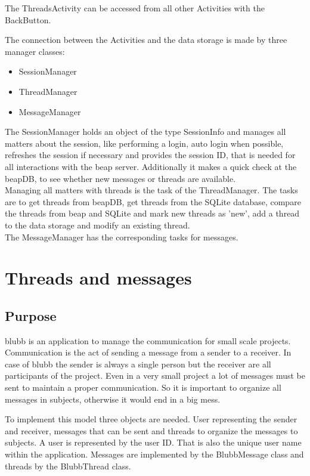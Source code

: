 \documentclass[12pt,a4paper,oneside]{report}
\newcommand{\appname}{blubb}
\newcommand{\beapDB}{beapDB}
\newcommand{\beapServer}{beap server}
\begin{document}
The ThreadsActivity can be accessed from all other Activities with the BackButton.


The connection between the Activities and the data storage is made by three manager classes:
\begin{itemize}
\item{SessionManager}
\item{ThreadManager}
\item{MessageManager}
\end{itemize}

The SessionManager holds an object of the type SessionInfo and manages all matters about the session, like performing a login, auto login when possible, refreshes the session if necessary and provides the session ID, that is needed for all interactions with the \beapServer{}. Additionally it makes a quick check at the \beapDB{}, to see whether new messages or threads are available.\\

Managing all matters with threads is the task of the ThreadManager. The tasks are to get threads from \beapDB{}, get threads from the SQLite database, compare the threads from beap and SQLite and mark new threads as 'new', add a thread to the data storage and modify an existing thread. \\

The MessageManager has the corresponding tasks for messages. 
\section{Threads and messages}
\subsection{Purpose}
\appname{} is an application to manage the communication for small scale projects. Communication is the act of sending a message from a sender to a receiver. In case of \appname{} the sender is always a single person but the receiver are all participants of the project. Even in a very small project a lot of messages must be sent to maintain a proper communication. So it is important to organize all messages in subjects, otherwise it would end in a big mess.


To implement this model three objects are needed. User representing the sender and receiver, messages that can be sent and threads to organize the messages to subjects. A user is represented by the user ID. That is also the unique user name within the application. Messages are implemented by the BlubbMessage class and threads by the BlubbThread class.
\end{document}
